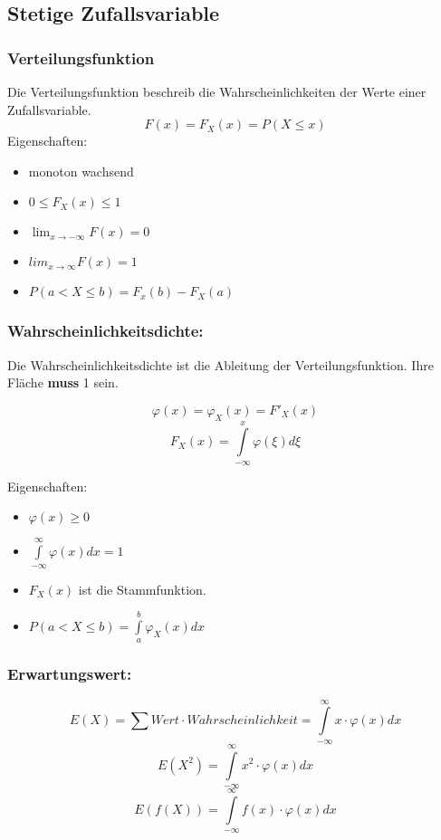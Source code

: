 \documentclass[margin=normal]{tex/hsrzf}
\begin{document}
\subsection{Stetige Zufallsvariable}
\begin{multicols}{2}

    \subsubsection*{Verteilungsfunktion}
    Die Verteilungsfunktion beschreib die Wahrscheinlichkeiten der Werte einer Zufallsvariable.
    $$F(x)= F_X(x) = P(X \leq x)$$
    Eigenschaften:
    \begin{itemize}
        \item monoton wachsend
        \item $0 \leq F_X(x) \leq 1$
        \item $\lim_{x \to -\infty}  F(x) = 0$
        \item $lim_{x \to \infty} F(x) = 1$
        \item $P(a < X \leq b) = F_x(b) - F_X(a)$
    \end{itemize}

    \subsubsection*{Wahrscheinlichkeitsdichte:}
    Die Wahrscheinlichkeitsdichte ist die Ableitung der Verteilungsfunktion.
    Ihre Fläche \textbf{muss} 1 sein.

    $$\varphi(x) = \varphi_X(x) = F'_X(x)$$
    $$F_X(x) = \int \limits _{-\infty} ^{x} \varphi(\xi)d\xi$$

    Eigenschaften:
    \begin{itemize}
        \item $\varphi(x) \geq 0$
        \item $\int \limits _{-\infty} ^{\infty} \varphi(x)dx = 1$
        \item $F_X(x)$ ist die Stammfunktion.
        \item $P(a < X \leq b) =\int \limits _a ^b \varphi_X(x)dx$
    \end{itemize}

    \subsubsection{Erwartungswert:}
    $$E(X) = \sum Wert \cdot Wahrscheinlichkeit = \int \limits _{-\infty} ^{\infty} x \cdot \varphi(x)dx $$
    $$E(X^2) = \int \limits _{-\infty} ^{\infty} x^2 \cdot \varphi(x) dx$$
    $$E(f(X)) = \int \limits _{-\infty} ^{\infty} f(x) \cdot \varphi(x)dx$$


\end{multicols}
\end{document}
